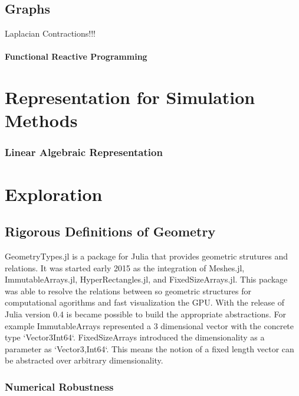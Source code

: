 \documentclass[a4paper]{article}
\begin{document}
\subsection{Graphs}

Laplacian Contractions!!!


\paragraph{Functional Reactive Programming}

\section{Representation for Simulation Methods}


\subsubsection{Linear Algebraic Representation}
\cite{DiCarlo_Paoluzzi_Shapiro_2014}

\section{Exploration}

\subsection{Rigorous Definitions of Geometry}

GeometryTypes.jl is a package for Julia that provides geometric strutures and
relations. It was started early 2015 as the integration of Meshes.jl,
ImmutableArrays.jl, HyperRectangles.jl, and FixedSizeArrays.jl. This package
was able to resolve the relations between so geometric structures for
computational agorithms and fast visualization the GPU. With the
release of Julia version 0.4 is became possible to build the appropriate
abstractions. For example ImmutableArrays represented a 3 dimensional
vector with the concrete type `Vector3{Int64}`. FixedSizeArrays introduced
the dimensionality as a parameter as `Vector{3,Int64}`. This means the notion
of a fixed length vector can be abstracted over arbitrary dimensionality.

\subsubsection{Numerical Robustness}


\cite{Gappa}
\end{document}
